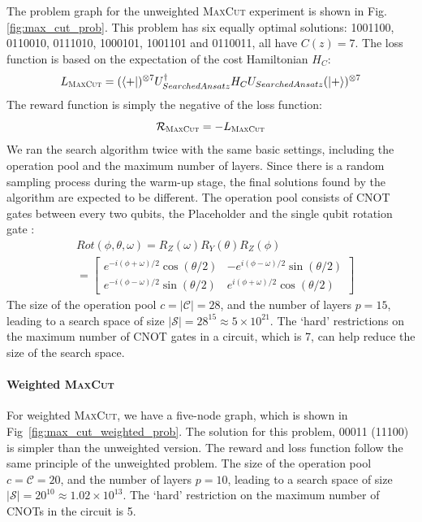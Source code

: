 \documentclass{ieeeaccess}
\begin{document}
  The problem graph for the unweighted \textsc{MaxCut} experiment is shown in Fig. \ref{fig:max_cut_prob}. This problem has six equally optimal solutions: 1001100, 0110010, 0111010, 1000101, 1001101 and 0110011, all have $C(z)=7$. The loss function is based on the expectation of the cost Hamiltonian $H_C$:
  \begin{equation}
      L_{\textsc{MaxCut}} = (\bra{+})^{\otimes 7}U_{\rm SearchedAnsatz}^{\dagger} H_C U_{\rm SearchedAnsatz}   (\ket{+})^{\otimes 7}
  \end{equation}
  The reward function is simply the negative of the loss function:
  \begin{equation}
      \mathcal{R}_{\textsc{MaxCut}} = -L_{\textsc{MaxCut}}
  \end{equation}
  We ran the search algorithm twice with the same basic settings, including the operation pool and the maximum number of layers. Since there is a random sampling process during the warm-up stage, the final solutions found by the algorithm are expected to be different. The operation pool consists of CNOT gates between every two qubits, the Placeholder and the single qubit rotation gate \cite{nielsen00}:
  \begin{equation}
    \begin{split}
  &Rot(\phi, \theta, \omega)=R_Z(\omega) R_Y(\theta) R_Z(\phi)\\
  & =\left[\begin{array}{cc}
  e^{-i(\phi+\omega) / 2} \cos (\theta / 2) & -e^{i(\phi-\omega) / 2} \sin (\theta / 2) \\
  e^{-i(\phi-\omega) / 2} \sin (\theta / 2) & e^{i(\phi+\omega) / 2} \cos (\theta / 2)
  \end{array}\right]
    \end{split}
  \end{equation}
  The size of the operation pool $c = \vert \mathcal{C} \vert = 28$, and the number of layers $p = 15$, leading to a search space of size $\vert \mathcal{S} \vert = 28^{15} \approx 5 \times10^{21}$. The `hard' restrictions on the maximum number of CNOT gates in a circuit, which is 7,  can help reduce the size of the search space.
  
  \paragraph{Weighted \textsc{MaxCut}} For weighted \textsc{MaxCut}, we have a five-node graph, which is shown in Fig~\ref{fig:max_cut_weighted_prob}. The solution for this problem, 00011 (11100) is simpler than the unweighted version. The reward and loss function follow the same principle of the unweighted problem. The size of the operation pool $c = \mathcal{C} = 20$, and the number of layers $p = 10$, leading to a search space of size $\vert \mathcal{S} \vert = 20^{10} \approx 1.02\times 10^{13}$. The `hard' restriction on the maximum number of CNOTs in the circuit is 5.
\end{document}
